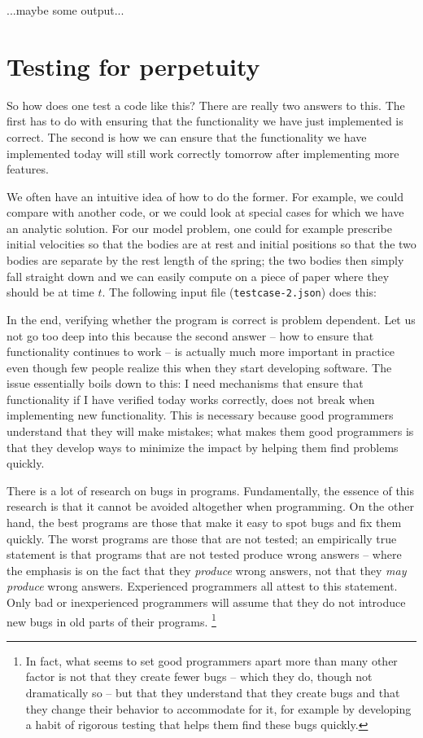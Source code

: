 \documentclass{article}
\begin{document}
...maybe some output...


\section{Testing for perpetuity}
\label{sec:testing}


So how does one test a code like this? There are really two answers to
this. The first has to do with ensuring that the functionality we have just
implemented is correct. The second is how we can ensure that the functionality
we have implemented today will still work correctly tomorrow after
implementing more features.

We often have an intuitive idea of how to do the former. For example, we could
compare with another code, or we could look at special cases for which we have
an analytic solution. For our model problem, one could for example prescribe
initial velocities so that the bodies are at rest and initial positions so
that the two bodies are separate by the rest length of the spring; the two
bodies then simply fall straight down and we can easily compute on a piece of
paper where they should be at time $t$. The following input file
(\texttt{testcase-2.json}) does this:


In the end, verifying whether the program is correct is problem dependent. Let
us not go too deep into this because the second answer -- how to ensure that
functionality continues to work -- is actually much more important in practice
even though few people realize this when they start developing software. The
issue essentially boils down to this: I need mechanisms that ensure that
functionality if I have verified today works correctly, does not break when
implementing new functionality. This is necessary because good programmers
understand that they will make mistakes; what makes them good programmers is
that they develop ways to minimize the impact by helping them find problems
quickly. 

There is a lot of research on bugs in programs. Fundamentally, the essence of
this research is that it cannot be avoided altogether when programming. On the
other hand, the best programs are those that make it easy to spot bugs and fix
them quickly. The worst programs are those that are not tested; an empirically
true statement is that programs that are not tested produce wrong answers --
where the emphasis is on the fact that they \textit{produce} wrong answers,
not that they \textit{may produce} wrong answers. Experienced programmers all
attest to this statement. Only bad or inexperienced programmers will assume
that they do not introduce new bugs in old parts of their programs.%
\footnote{In fact, what seems to set good programmers apart more than many
  other factor is not that they create fewer bugs -- which they do, though not
  dramatically so -- but that they understand that they create bugs and that
  they change their behavior to accommodate for it, for example by developing
  a habit of rigorous testing that helps them find these bugs quickly.}
\end{document}
